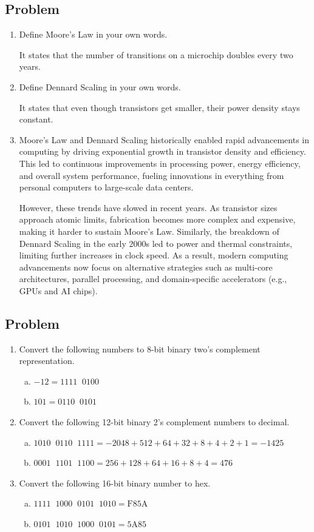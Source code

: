 \documentclass[12pt, letterpaper]{article}
\newcounter{problem}
\newcommand{\q}{
    \newpage %
    \stepcounter{problem} %
    \subsection*{Problem \arabic{problem}} %
}
\begin{document}
\q

\begin{enumerate}
    \item Define Moore's Law in your own words.
    
    It states that the number of transitions on a microchip doubles every two years.

    \item Define Dennard Scaling in your own words.
    
    It states that even though transistors get smaller, their power density stays constant.

    \item Moore’s Law and Dennard Scaling historically enabled rapid advancements in computing by driving exponential growth in transistor density and efficiency. This led to continuous improvements in processing power, energy efficiency, and overall system performance, fueling innovations in everything from personal computers to large-scale data centers.

    However, these trends have slowed in recent years. As transistor sizes approach atomic limits, fabrication becomes more complex and expensive, making it harder to sustain Moore’s Law. Similarly, the breakdown of Dennard Scaling in the early 2000s led to power and thermal constraints, limiting further increases in clock speed. As a result, modern computing advancements now focus on alternative strategies such as multi-core architectures, parallel processing, and domain-specific accelerators (e.g., GPUs and AI chips).
\end{enumerate}

\q
\begin{enumerate}
    \item Convert the following numbers to 8-bit binary two's complement representation.
    \begin{enumerate}[a.]
        \item $-12=1111\;\;0100$
        \item $101=0110\;\;0101$
    \end{enumerate}
    \item Convert the following 12-bit binary 2's complement numbers to decimal.
    \begin{enumerate}[a.]
        \item $1010\;\;0110\;\;1111=-2048+512+64+32+8+4+2+1=-1425$
        \item $0001\;\;1101\;\;1100=256+128+64+16+8+4=476$
    \end{enumerate}
    \item Convert the following 16-bit binary number to hex.
    \begin{enumerate}[a.]
        \item $1111\;\;1000\;\;0101\;\;1010=\text{F85A}$
        \item $0101\;\;1010\;\;1000\;\;0101=\text{5A85}$
    \end{enumerate}
\end{enumerate}
\end{document}
